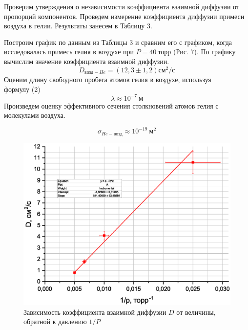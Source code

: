 \documentclass[a4paper,12pt]{article}
\theoremstyle{plain} %
\theoremstyle{definition} %
\theoremstyle{remark} %
\begin{document}
Проверим утверждения о независимости коэффициента взаимной диффузии от пропорций компонентов. Проведем измерение коэффициента диффузии примеси воздуха в гелии. Результаты занесем в Таблицу 3.

Построим график по данным из Таблицы 3 и сравним его с графиком, когда исследовалась примесь гелия в воздухе при $P = 40\ \text{торр}$ (Рис. 7). По графику вычислим значение коэффициента взаимной диффузии.
\[ D_{\text{возд} - He} = (12,3\pm1,2) \text{см}^2/\text{с}  \]
Оценим длину свободного пробега атомов гелия в воздухе, используя \\ формулу (2)
\[\lambda \approx 10^{-7}\ \text{м}\]
\newpage
Произведем оценку эффективного сечения столкновений атомов гелия с молекулами воздуха.

\[\sigma_{He - \text{возд}} \approx  10^{-19}\ \text{м}^2\]
\begin{figure}[H]
	\begin{center}
		\includegraphics[width=\linewidth]{7}
		\caption{Зависимость коэффициента взаимной диффузии $D$ от величины, обратной к давлению $1/P$}
	\end{center}
\end{figure}
\end{document}
